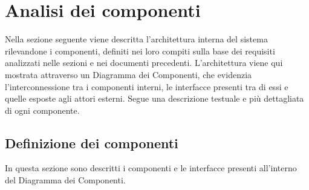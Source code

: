 \documentclass[11pt, a4paper]{article}
\theoremstyle{definition} %
\begin{document}
\newpage
\section{Analisi dei componenti}



Nella sezione seguente viene descritta l'architettura interna del sistema
rilevandone i componenti, definiti nei loro compiti sulla base dei requisiti
analizzati nelle sezioni e nei documenti precedenti. L'architettura viene
qui mostrata attraverso un Diagramma dei Componenti, che evidenzia
l'interconnessione tra i componenti interni, le interfacce presenti tra di
essi e quelle esposte agli attori esterni. Segue una descrizione testuale
e più dettagliata di ogni componente.


\subsection{Definizione dei componenti}
In questa sezione sono descritti i componenti e le interfacce presenti
all'interno del Diagramma dei Componenti.

\iffalse
\end{document}
